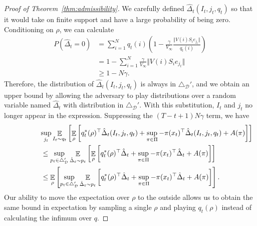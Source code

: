 \documentclass{article}
\begin{document}
\begin{proof}[Proof of Theorem~\ref{thm:admissibility}]
We carefully defined $\hat\Delta_t(I_t,j_t,q_t)$ so that it would take on finite support and have a large probability of being zero. Conditioning on $\rho$, we can calculate
\begin{align*}
  P(\hat\Delta_t = 0)
  &=
    \sum_{i=1}^N
    q_t(i)
    \left( 1 - \frac{\gamma}{V_\infty} \frac{\Vert V(i) S_i e_{j_t} \Vert}{q_t(i)} \right)
  \\
  &=
    1-
    \sum_{i=1}^N
    \frac{\gamma}{V_\infty} \Vert V(i)S_i e_{j_t}  \Vert
  \\
  &\geq
  1-N \gamma.
\end{align*}
Therefore, the distribution of $\hat\Delta_t(I_t,j_t,q_t)$ is always in $\triangle_{\mathcal D}'$, and we obtain an upper bound by allowing the adversary to play distributions over a random variable named $\hat\Delta_t$ with distribution in $\triangle_{\mathcal D}'$. With this substitution, $I_t$ and $j_t$ no longer appear in the expression. Suppressing the $(T-t+1)N\gamma$ term, we have
\begin{align*}
  &\lefteqn{
        \sup_{j_t } \mathop{\ex}_{I_t\sim q_t}\left[\mathop{\ex}_{\rho}\left[ q_t^*(\rho)^\top \hat \Delta_t(I_t,j_t,q_t)
    +
    \sup_{\pi\in\Pi} -\pi(x_t)^\top\hat\Delta_t(I_t,j_t,q_t) + A(\pi)\right]\right]
    }\\
  &\leq
    \sup_{p_t\in\triangle_{\mathcal D}'} \mathop{\ex}_{\hat\Delta_t\sim p_t}\left[
    \mathop{\ex}_{\rho}\left[ q_t^*(\rho)^\top  \hat \Delta_t
    +
    \sup_{\pi\in\Pi} -\pi(x_t)^\top \hat\Delta_t + A(\pi)\right]\right]\\
    &\leq
\mathop{\ex}_{\rho}\left[ \sup_{p_t\in\triangle_{\mathcal D}'} \mathop{\ex}_{\hat\Delta_t\sim p_t}\left[ q_t^*(\rho)^\top  \hat \Delta_t
    +
  \sup_{\pi\in\Pi} -\pi(x_t)^\top \hat\Delta_t + A(\pi)\right]\right].
\end{align*}
Our ability to move the expectation over $\rho$ to the outside allows us to obtain the same bound in expectation by sampling a single $\rho$ and playing $q_t(\rho)$ instead of calculating the infimum over $q$. 


\end{proof}
\end{document}
